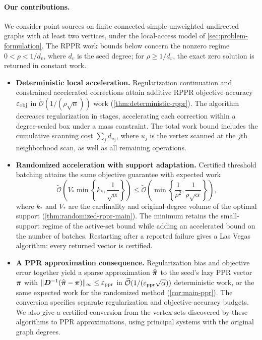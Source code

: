 \paragraph{Our contributions.}
We consider point sources on finite connected simple unweighted undirected
graphs with at least two vertices, under the local-access model of
\cref{sec:problem-formulation}. The RPPR work bounds below concern the
nonzero regime $0<\rho<1/d_v$, where $d_v$ is the seed degree; for
$\rho\geq1/d_v$, the exact zero solution is returned in constant work.
\begin{itemize}[leftmargin=*]
\item \textbf{Deterministic local acceleration.}
Regularization continuation and constrained accelerated corrections
attain additive RPPR objective accuracy $\varepsilon_{\mathrm{obj}}$ in
$\widetilde{\mathcal{O}}(1/(\rho\sqrt\alpha))$ work
(\cref{thm:deterministic-rppr}). The algorithm decreases regularization in
stages, accelerating each correction within a degree-scaled box under a
mass constraint. The total work bound includes the cumulative scanning
cost $\sum_j d_{u_j}$, where $u_j$ is the vertex scanned at the $j$th
neighborhood scan, as well as all remaining operations.

\item \textbf{Randomized acceleration with support adaptation.}
Certified threshold batching attains the same objective guarantee with
expected work
\begin{equation}
 \widetilde{\mathcal{O}}\!\left(
      V_*\min\left\{k_*,\frac1{\sqrt\alpha}\right\}\right)
 \leq\widetilde{\mathcal{O}}\!\left(
      \min\left\{\frac1{\rho^2},\frac1{\rho\sqrt\alpha}\right\}\right),
 \label{eq:intro-random-adaptive}
\end{equation}
where $k_*$ and $V_*$ are the cardinality and original-degree volume
of the optimal support (\cref{thm:randomized-rppr-main}). The minimum
retains the small-support regime of the active-set bound while adding an
accelerated bound on the number of batches. Restarting after a reported
failure gives a Las Vegas algorithm: every returned vector is certified.

\item \textbf{A PPR approximation consequence.}
Regularization bias and objective error together yield a sparse
approximation $\widehat{\bm{\pi}}$ to the seed's lazy PPR vector $\bm{\pi}$ with
$\lVert\bm{D}^{-1}(\widehat{\bm{\pi}}-\bm{\pi})\rVert_\infty\leq\varepsilon_{\mathrm{ppr}}$ in
$\widetilde{\mathcal{O}}(1/(\varepsilon_{\mathrm{ppr}}\sqrt\alpha))$ deterministic work, or the
same expected work for the randomized method
(\cref{cor:main-ppr}). The conversion specifies separate regularization
and objective-accuracy budgets. We also give a certified conversion from
the vertex sets discovered by these algorithms to PPR approximations,
using principal systems with the original graph degrees.
\end{itemize}

